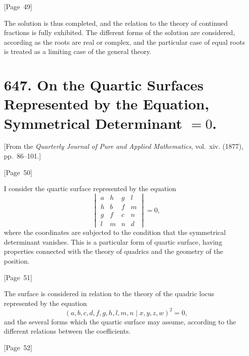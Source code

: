 \documentclass[11pt,a4paper]{book}
\begin{document}
\begin{center}
[Page~49]
\end{center}

The solution is thus completed, and the relation to the theory of
continued fractions is fully exhibited. The different forms of the
solution are considered, according as the roots are real or complex,
and the particular case of equal roots is treated as a limiting case
of the general theory.


\newpage
\section*{647. On the Quartic Surfaces Represented by the Equation, Symmetrical Determinant $=0$.}

[From the \textit{Quarterly Journal of Pure and Applied Mathematics},
vol.~xiv. (1877), pp.~86--101.]

\begin{center}
[Page~50]
\end{center}

I consider the quartic surface represented by the equation
\[
\begin{vmatrix}
a & h & g & l \\
h & b & f & m \\
g & f & c & n \\
l & m & n & d
\end{vmatrix} = 0,
\]
where the coordinates are subjected to the condition that the
symmetrical determinant vanishes. This is a particular form of quartic
surface, having properties connected with the theory of quadrics and
the geometry of the position.

\begin{center}
[Page~51]
\end{center}

The surface is considered in relation to the theory of the quadric
locus represented by the equation
\[
(a,b,c,d,f,g,h,l,m,n\mid x,y,z,w)^2 = 0,
\]
and the several forms which the quartic surface may assume, according
to the different relations between the coefficients.

\begin{center}
[Page~52]
\end{center}
\end{document}
